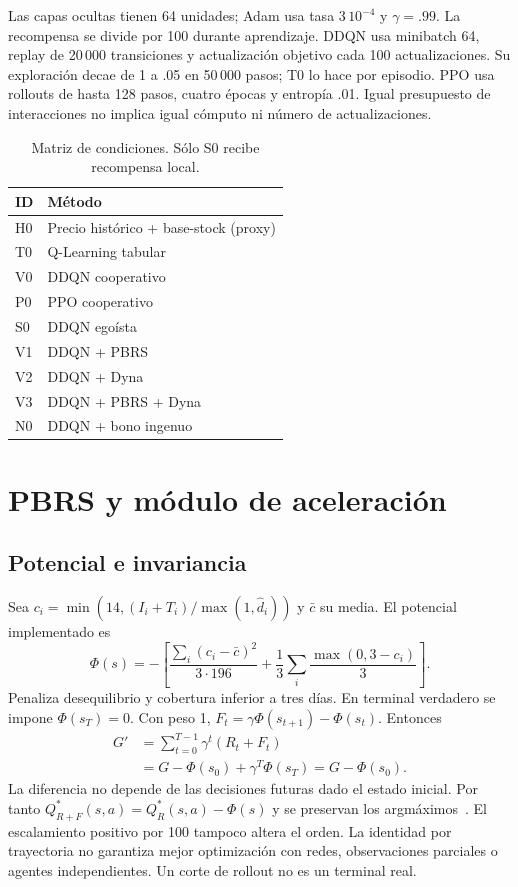 \documentclass[conference]{IEEEtran}
\begin{document}
Las capas ocultas tienen 64 unidades; Adam usa tasa $3\,10^{-4}$ y $\gamma=.99$. La recompensa se divide por 100 durante aprendizaje. DDQN usa minibatch 64, replay de 20\,000 transiciones y actualización objetivo cada 100 actualizaciones. Su exploración decae de 1 a .05 en 50\,000 pasos; T0 lo hace por episodio. PPO usa rollouts de hasta 128 pasos, cuatro épocas y entropía .01. Igual presupuesto de interacciones no implica igual cómputo ni número de actualizaciones.

\begin{table}[t]
\caption{Matriz de condiciones. Sólo S0 recibe recompensa local.}
\centering\small
\begin{tabular}{ll}
\toprule ID & Método\\\midrule
H0 & Precio histórico + base-stock (proxy)\\
T0 & Q-Learning tabular\\
V0 & DDQN cooperativo\\
P0 & PPO cooperativo\\
S0 & DDQN egoísta\\
V1 & DDQN + PBRS\\
V2 & DDQN + Dyna\\
V3 & DDQN + PBRS + Dyna\\
N0 & DDQN + bono ingenuo\\\bottomrule
\end{tabular}
\end{table}

\section{PBRS y módulo de aceleración}
\subsection{Potencial e invariancia}
Sea $c_i=\min(14,(I_i+T_i)/\max(1,\widehat d_i))$ y $\bar c$ su media. El potencial implementado es
\[
\Phi(s)=-\left[\frac{\sum_i(c_i-\bar c)^2}{3\cdot196}
+\frac{1}{3}\sum_i\frac{\max(0,3-c_i)}{3}\right].
\]
Penaliza desequilibrio y cobertura inferior a tres días. En terminal verdadero se impone $\Phi(s_T)=0$. Con peso 1, $F_t=\gamma\Phi(s_{t+1})-\Phi(s_t)$. Entonces
\[
\begin{aligned}
G'&=\sum_{t=0}^{T-1}\gamma^t(R_t+F_t)\\
 &=G-\Phi(s_0)+\gamma^T\Phi(s_T)=G-\Phi(s_0).
\end{aligned}
\]
La diferencia no depende de las decisiones futuras dado el estado inicial. Por tanto $Q_{R+F}^*(s,a)=Q_R^*(s,a)-\Phi(s)$ y se preservan los argmáximos~\cite{pbrs}. El escalamiento positivo por 100 tampoco altera el orden. La identidad por trayectoria no garantiza mejor optimización con redes, observaciones parciales o agentes independientes. Un corte de rollout no es un terminal real.
\end{document}
